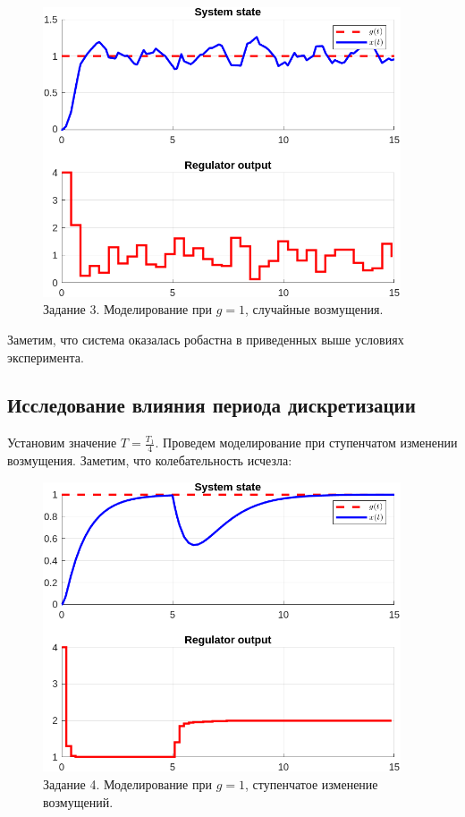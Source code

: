 \documentclass[a4paper, 14pt]{extarticle}
\theoremstyle{definition}
\theoremstyle{plain}
\theoremstyle{remark}
\begin{document}
\begin{figure}
    [H]
    \centering
    \includegraphics[width=300pt]{images/task3__noise_perturb_state.png}
    \caption{Задание 3. Моделирование при $g=1$, случайные возмущения.}
    \label{fig:task3__noise_perturb_state}
\end{figure}

Заметим, что система оказалась робастна в приведенных выше условиях эксперимента.
\subsection{Исследование влияния периода дискретизации}
Установим значение $T = \frac{T_1}{4}$. Проведем моделирование при ступенчатом изменении возмущения. Заметим, что колебательность исчезла:
\begin{figure}
    [H]
    \centering
    \includegraphics[width=300pt]{images/task4__step_perturb_state.png}
    \caption{Задание 4. Моделирование при $g=1$, ступенчатое изменение возмущений.}
    \label{fig:task4__step_perturb_state}
\end{figure}
\end{document}
